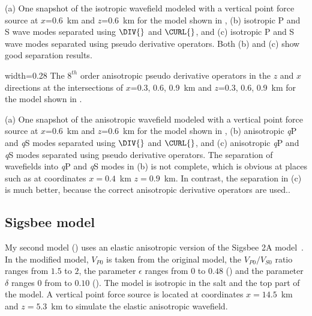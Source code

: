 {(a) One snapshot of the isotropic wavefield modeled with a vertical
point force source at $x$=0.6~km and $z$=0.6~km for the model shown in
{, (b) isotropic P and S wave modes
separated using $\DIV{}$ and $\CURL{}$, and (c) isotropic P and S wave modes
separated using pseudo derivative operators. Both (b) and (c) show good separation
results.}}

{width=0.28\textwidth} {The $8^{th}$ order anisotropic pseudo
derivative operators in the $z$ and $x$ directions at the
intersections of $x$=0.3, 0.6, 0.9~km and $z$=0.3, 0.6, 0.9~km for 
the model shown in {}.
}



{(a) One snapshot of the anisotropic wavefield modeled with a vertical
point force source at $x$=0.6~km and $z$=0.6~km for the model shown in
{}, (b) anisotropic {\it q}P
and {\it q}S modes separated using $\DIV{}$ and $\CURL{}$, and (c)
anisotropic {\it q}P and {\it q}S modes separated using pseudo
derivative operators.  The separation of wavefields into {\it q}P and
{\it q}S modes in (b) is not complete, which is obvious at places such
as at coordinates $x=0.4$~km $z=0.9$~km. In contrast, the separation
in (c) is {much better, because the correct
anisotropic derivative operators are used.}.  }




\subsection{Sigsbee model}
My second model () uses an
elastic anisotropic version of the Sigsbee 2A
model~\cite[]{SEG-2002-21222125}. In the modified model, $V_{P0}$ 
is taken from the original model, the $V_{P0}/V_{S0}$ ratio ranges
from $1.5$ to $2$, the parameter $\epsilon$ ranges from $0$ to $0.48$
() and the parameter $\delta$ ranges $0$ from to
$0.10$ (). The model is isotropic in the salt and
the top part of the model. A vertical point force source is located at
coordinates $x=14.5$~km and $z=5.3$~km to simulate the elastic
anisotropic wavefield.


